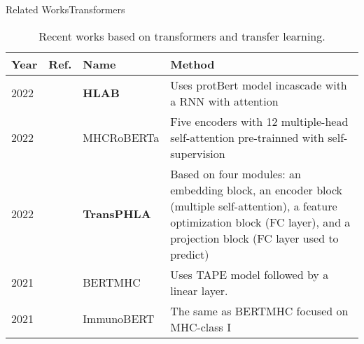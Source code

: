\documentclass[10pt]{beamer}
\newcommand{\1}{
	\setbeamertemplate{background}{
		\texttt{[image: img/1]}
		\tikz[overlay] \fill[fill opacity=0.75,fill=white] (0,0) rectangle (-\paperwidth,\paperheight);
	}
}
\begin{document}
\begin{frame}{Related Works}{Transformers}
	
	\fontsize{8pt}{5pt}\selectfont
	
	\begin{table}[]
		\centering
		\caption{Recent works based on transformers and transfer learning.}		
		\setlength{\tabcolsep}{0.5em} %
		{\renewcommand{\arraystretch}{2}%
			\begin{tabular}{p{0.6cm}p{0.6cm}p{2cm}p{5cm}}
				\textbf{Year} & \textbf{Ref.}                                  & \textbf{Name} & \textbf{Method}                                                                                                                                                                                                         \\ \hline
				2022 		  & \cite{zhang2022hlab} 		  &		\textbf{HLAB} 			 	   & Uses protBert model incascade with a RNN with attention  \\
				2022          & \cite{wang2022mhcroberta}     &     MHCRoBERTa           & Five encoders with 12 multiple-head self-attention pre-trainned with self-supervision             \\
				2022          & \cite{chu2022transformer}     &     \textbf{TransPHLA}             & Based on four modules: an embedding block, an encoder block (multiple self-attention), a feature optimization block (FC layer), and a projection block (FC layer used to predict)          \\
				2021          & \cite{cheng2021bertmhc}       &     BERTMHC             & Uses TAPE model followed by a linear layer.                          \\
				2021          & \cite{gasser2021interpreting} &     ImmunoBERT    	        & The same as BERTMHC focused on MHC-class I  \\
				
				           
			\end{tabular}
		}
	\end{table}	
\end{frame}


\end{document}
